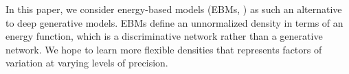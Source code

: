 \documentclass[tablecaption=bottom,wcp]{jmlr} %
\begin{document}


In this paper, we consider energy-based models (EBMs, \cite{du2019implicit, nijkamp2019anatomy, nijkamp2019learning}) as such an alternative to deep generative models. EBMs define an unnormalized density in terms of an energy function, which is a discriminative network rather than a generative network. We hope to learn more flexible densities that represents factors of variation at varying levels of precision.





\end{document}
